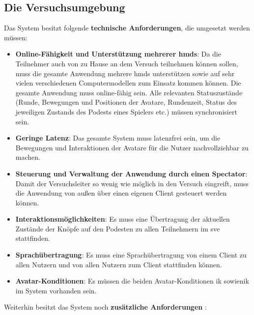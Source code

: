 \documentclass[a4paper,11pt]{article}%
\renewcommand{\\}{\vspace*{0.5\baselineskip} \newline}
\begin{document}
	\subsection{Die Versuchsumgebung}
\label{TechnischeAnforderungen}
Das System besitzt folgende \textbf{technische Anforderungen}, die umgesetzt werden müssen:
\begin{itemize}
\item \textbf{Online-Fähigkeit und Unterstützung mehrerer \ac{hmd}s}: Da die Teilnehmer auch von zu Hause an dem Versuch teilnehmen können sollen, muss die gesamte Anwendung mehrere \ac{hmd}s unterstützen sowie auf sehr vielen verschiedenen Computermodellen zum Einsatz kommen können. Die gesamte Anwendung muss online-fähig sein. Alle relevanten Statuszustände (Runde, Bewegungen und Positionen der Avatare, Rundenzeit, Status des jeweiligen Zustands des Podests eines Spielers etc.) müssen synchronisiert sein.
\item \textbf{Geringe Latenz}: Das gesamte System muss latenzfrei sein, um die Bewegungen und Interaktionen der Avatare für die Nutzer nachvollziehbar zu machen.
\item \textbf{Steuerung und Verwaltung der Anwendung durch einen Spectator}: Damit der Versuchsleiter so wenig wie möglich in den Versuch eingreift, muss die Anwendung von außen über einen eigenen Client gesteuert werden können.
\item \textbf{Interaktionsmöglichkeiten}: Es muss eine Übertragung der aktuellen Zustände der Knöpfe auf den Podesten zu allen Teilnehmern im \ac{sve} stattfinden.
\item \textbf{Sprachübertragung}: Es muss eine Sprachübertragung von einem Client zu allen Nutzern und von allen Nutzern zum Client stattfinden können.
\item \textbf{Avatar-Konditionen}: Es müssen die beiden Avatar-Konditionen \ac{ik} sowie\newline \ac{nik} im System vorhanden sein.
\end{itemize}

Weiterhin besitzt das System noch \textbf{zusätzliche Anforderungen} :
\end{document}
